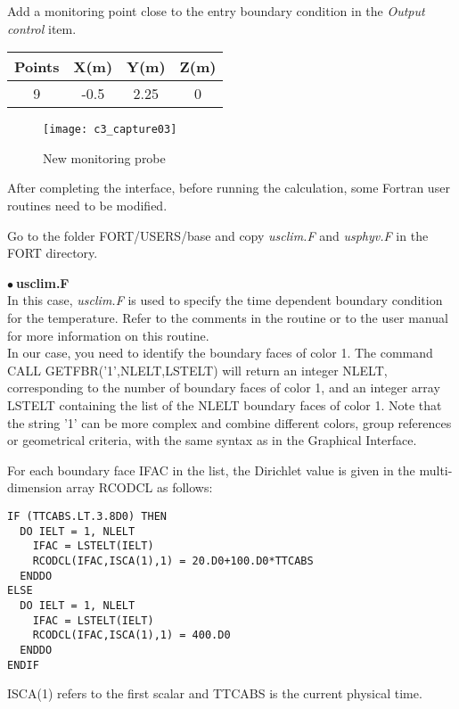 \newpage
Add a monitoring point close to the entry boundary condition in the
{\itshape Output control} item.

\begin{center}
\begin{tabular}{|c|c|c|c|}
\hline
Points & X(m) & Y(m) & Z(m)\\
\hline
9 & -0.5 & 2.25 & 0 \\
\hline
\end{tabular}
\end{center}

\begin{figure}[h!]
\begin{center}
\texttt{[image: c3\_capture03]}
\caption{New monitoring probe}
\label{fig3_e3}
\end{center}
\end{figure}


\newpage
After completing the interface, before running the calculation,
some Fortran user routines need to be modified.

Go to the folder FORT/USERS/base and copy {\itshape usclim.F} and
{\itshape usphyv.F} in the FORT directory.

$\bullet\ $\textbf{usclim.F}\\
In this case, {\itshape usclim.F} is used to specify the time dependent boundary
condition for
the temperature. Refer to the comments in the routine or to the \CS user manual
for more information on this routine.\\
In our case, you need to identify the boundary faces of color 1. The command\\
CALL GETFBR('1',NLELT,LSTELT)
will return an integer NLELT, corresponding to the number of boundary faces of
color 1, and an integer array LSTELT containing the list of the NLELT boundary
faces of color 1. Note that the string '1' can be more complex and combine
different colors, group references or geometrical criteria, with the same syntax
as in the Graphical Interface.

For each boundary face IFAC in the list, the Dirichlet value is given in the
multi-dimension array RCODCL as follows:
\begin{verbatim}
IF (TTCABS.LT.3.8D0) THEN
  DO IELT = 1, NLELT
    IFAC = LSTELT(IELT)
    RCODCL(IFAC,ISCA(1),1) = 20.D0+100.D0*TTCABS
  ENDDO
ELSE
  DO IELT = 1, NLELT
    IFAC = LSTELT(IELT)
    RCODCL(IFAC,ISCA(1),1) = 400.D0
  ENDDO
ENDIF
\end{verbatim}
ISCA(1) refers to the first scalar and TTCABS is the current physical time.

